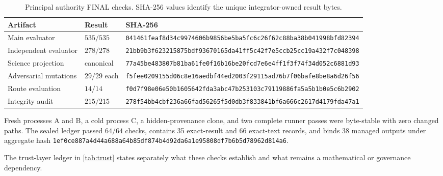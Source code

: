 \begin{table}[H]
\centering
\caption{Principal authority FINAL checks.  SHA-256 values identify the unique
integrator-owned result bytes.}
\label{tab:authority-final}
\scriptsize
\begin{tabularx}{\textwidth}{@{}L{2.8cm}L{1.8cm}Y@{}}
\toprule
Artifact & Result & SHA-256 \\
\midrule
Main evaluator & $535/535$ &
\nolinkurl{041461feaf8d34c9974606b9856be5ba5fc6c26f62c88ba38b041998bfd82394} \\
Independent evaluator & $278/278$ &
\nolinkurl{21bb9b3f623215875bdf93670165da41ff5c42f7e5ccb25cc19a432f7c048398} \\
Science projection & canonical &
\nolinkurl{77a45be483807b81ba61fe0f16b16be20fcd7e6e4ff1f3f74f34d052c6881d93} \\
Adversarial mutations & $29/29$ each &
\nolinkurl{f5fee0209155d06c8e16aedbf44ed2003f29115ad76b7f06bafe8be8a6d26f56} \\
Route evaluation & $14/14$ &
\nolinkurl{f0d7f98e06e50b1605642fda3abc47b253103c79119886fa5a5b1b0e5c6b2902} \\
Integrity audit & $215/215$ &
\nolinkurl{278f54bb4cbf236a66fad56265f5d0db3f833841bf6a666c2617d4179fda47a1} \\
\bottomrule
\end{tabularx}
\end{table}

Fresh processes A and B, a cold process C, a hidden-provenance clone, and two
complete runner passes were byte-stable with zero changed paths.  The sealed
ledger passed $64/64$ checks, contains 35 exact-result and 66 exact-text
records, and binds 38 managed outputs under aggregate hash
\nolinkurl{1ef0ce887a4d44a688a64b85df874b4d92da6a1e95808df7b6b5d78962d814a6}.

The trust-layer ledger in \cref{tab:trust} states separately what these checks
establish and what remains a mathematical or governance dependency.
